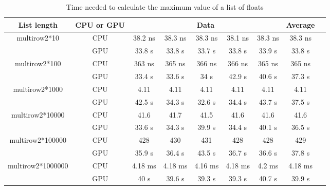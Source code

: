 \begin{table}[H]
  \caption{Time needed to calculate the maximum value of a list of floats}
  \label{table:time}
  \begin{center}
	  \begin{tabular}{| c | c | c | c | c | c | c | c | c |}
	    \hline
	    List length & CPU or GPU & \multicolumn{5}{|c|}{Data} & Average\\
		  \hline
		  multirow{2}{*}{10} & CPU & 38.2 ns & 38.3 ns & 38.3 ns & 38.1 ns & 38.3 ns & 38.3 ns\\ 
		  \hline
		  & GPU & 33.8 \mu s & 33.8 \mu s & 33.7 \mu s & 33.8 \mu s & 33.9 \mu s & 33.8 \mu s\\ 
		  \hline
		  multirow{2}{*}{100} & CPU & 363 ns & 365 ns & 366 ns & 366 ns & 365 ns & 365 ns\\ 
		  \hline
		  & GPU & 33.4 \mu s & 33.6 \mu s & 34 \mu s & 42.9 \mu s & 40.6 \mu s & 37.3 \mu s\\ 
		  \hline
		  multirow{2}{*}{1000} & CPU & 4.11 \mu & 4.11 \mu & 4.11 \mu & 4.11 \mu & 4.11 \mu & 4.11 \mu \\ 
		  \hline
		  & GPU & 42.5 \mu s & 34.3 \mu s & 32.6 \mu s & 34.4 \mu s & 43.7 \mu s & 37.5 \mu s\\  
		  \hline
		  multirow{2}{*}{10000} & CPU & 41.6 \mu & 41.7 \mu & 41.5 \mu & 41.6 \mu & 41.6 \mu & 41.6 \mu \\ 
		  \hline
		  & GPU & 33.6 \mu s & 34.3 \mu s & 39.9 \mu s & 34.4 \mu s & 40.1 \mu s & 36.5 \mu s\\  
		  \hline
		  multirow{2}{*}{100000} & CPU & 428 \mu & 430 \mu & 431 \mu & 428 \mu & 428 \mu & 429 \mu \\ 
		  \hline
		  & GPU & 35.9 \mu s & 36.4 \mu s & 43.5 \mu s & 36.7 \mu s & 36.6 \mu s & 37.8 \mu s\\  
		  \hline
		  multirow{2}{*}{1000000} & CPU & 4.18 ms & 4.18 ms & 4.16 ms & 4.18 ms & 4.2 ms & 4.18 ms\\ 
		  \hline
		  & GPU & 40 \mu s & 39.6 \mu s & 39.3 \mu s & 39.3 \mu s & 40.7 \mu s & 39.9 \mu s\\ 
		  \hline
	  \end{tabular}
  \end{center}
\end{table}

